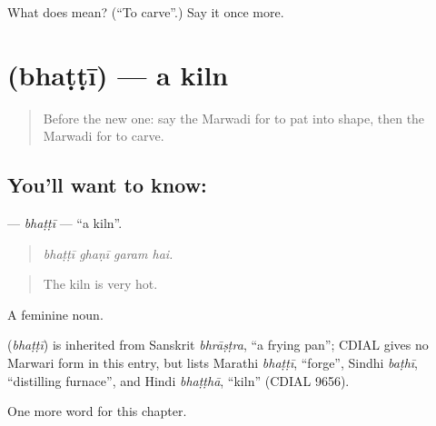 \begin{tcolorbox}[breakable,colback=teal!4,colframe=teal!35!black,title={Before you move on}]
What does  mean? (\textquotedblleft{}To carve\textquotedblright{}.) Say it once more.
\end{tcolorbox}
\section[\texorpdfstring{\mw{भट्टी} (bhaṭṭī)}{भट्टी (bhaṭṭī)}]{ (bhaṭṭī) — a kiln}

\label{lesson:MW-C281-bhatti}



\begin{quote}
Before the new one: say the Marwadi for to pat into shape, then the Marwadi for to carve.
\end{quote}

\subsection*{You'll want to know: }
\textbf{} — \emph{bhaṭṭī} — \textquotedblleft{}a kiln\textquotedblright{}.

\begin{quote}
   
\end{quote}

\begin{quote}
\emph{bhaṭṭī ghaṇī garam hai.}
\end{quote}

\begin{quote}
The kiln is very hot.
\end{quote}

A feminine noun.

\begin{cousinweb}
\textbf{} (\emph{bhaṭṭī}) is inherited from Sanskrit \emph{bhrāṣṭra}, \textquotedblleft{}a frying pan\textquotedblright{}; CDIAL gives no Marwari form in this entry, but lists Marathi \emph{bhaṭṭī}, \textquotedblleft{}forge\textquotedblright{}, Sindhi \emph{baṭhī}, \textquotedblleft{}distilling furnace\textquotedblright{}, and Hindi \emph{bhaṭṭhā}, \textquotedblleft{}kiln\textquotedblright{} (CDIAL 9656).
\end{cousinweb}

\begin{grammarlens}[title={What you've built}]
One more word for this chapter.
\end{grammarlens}

